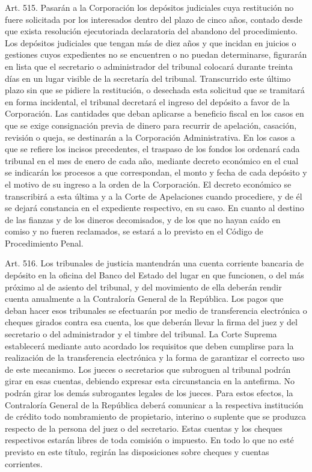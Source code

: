     Art. 515. Pasarán a la Corporación los depósitos judiciales cuya restitución no fuere solicitada por los interesados dentro del plazo de cinco años, contado desde que exista resolución ejecutoriada declaratoria del abandono del procedimiento.
    Los depósitos judiciales que tengan más de diez años y que incidan en juicios o gestiones cuyos expedientes no se encuentren o no puedan determinarse, figurarán en lista que el secretario o administrador del tribunal colocará durante treinta días en un lugar visible de la secretaría del tribunal. Transcurrido este último plazo sin que se pidiere la restitución, o desechada esta solicitud que se tramitará en forma incidental, el tribunal decretará el ingreso del depósito a favor de la Corporación.
    Las cantidades que deban aplicarse a beneficio fiscal en los casos en que se exige consignación previa de dinero para recurrir de apelación, casación, revisión o queja, se destinarán a la Corporación Administrativa.
    En los casos a que se refiere los incisos precedentes, el traspaso de los fondos los ordenará cada tribunal en el mes de enero de cada año, mediante decreto económico en el cual se indicarán los procesos a que correspondan, el monto y fecha de cada depósito y el motivo de su ingreso a la orden de la Corporación. El decreto económico se transcribirá a esta última y a la Corte de Apelaciones cuando procediere, y de él se dejará constancia en el expediente respectivo, en su caso.
    En cuanto al destino de las fianzas y de los dineros decomisados, y de los que no hayan caído en comiso y no fueren reclamados, se estará a lo previsto en el Código de Procedimiento Penal.



    Art. 516. Los tribunales de justicia mantendrán una cuenta corriente bancaria de depósito en la oficina del Banco del Estado del lugar en que funcionen, o del más próximo al de asiento del tribunal, y del movimiento de ella deberán rendir cuenta anualmente a la Contraloría General de la República.
    Los pagos que deban hacer esos tribunales se efectuarán por medio de transferencia electrónica o cheques girados contra esa cuenta, los que deberán llevar la firma del juez y del secretario o del administrador y el timbre del tribunal. La Corte Suprema establecerá mediante auto acordado los requisitos que deben cumplirse para la realización de la transferencia electrónica y la forma de garantizar el correcto uso de este mecanismo.
    Los jueces o secretarios que subroguen al tribunal podrán girar en esas cuentas, debiendo expresar esta circunstancia en la antefirma. No podrán girar los demás subrogantes legales de los jueces.
    Para estos efectos, la Contraloría General de la República deberá comunicar a la respectiva institución de crédito todo nombramiento de propietario, interino o suplente que se produzca respecto de la persona del juez o del secretario.
    Estas cuentas y los cheques respectivos estarán libres de toda comisión o impuesto.
    En todo lo que no esté previsto en este título, regirán las disposiciones sobre cheques y cuentas corrientes.


